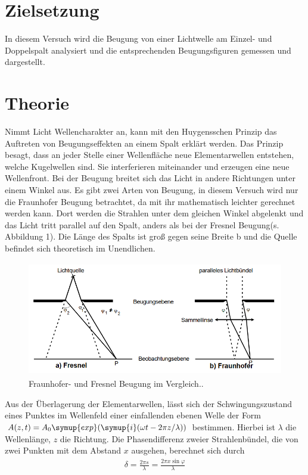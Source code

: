 \section{Zielsetzung}
\label{sec:Zielsetzung}
In diesem Versuch wird die Beugung von einer Lichtwelle am Einzel- und Doppelspalt analysiert und die entsprechenden Beugungsfiguren gemessen und dargestellt.

\section{Theorie}
\label{sec:Theorie}
Nimmt Licht Wellencharakter an, kann mit den Huygensschen Prinzip das Auftreten von Beugungseffekten an einem Spalt erklärt werden.
Das Prinzip besagt, dass an jeder Stelle einer Wellenfläche neue Elementarwellen entstehen, welche Kugelwellen sind. Sie interferieren miteinander und erzeugen eine neue Wellenfront. 
Bei der Beugung breitet sich das Licht in andere Richtungen unter einem Winkel aus. Es gibt zwei Arten von Beugung, in diesem Versuch wird nur die Fraunhofer Beugung betrachtet, da mit ihr mathematisch leichter gerechnet werden kann. 
Dort werden die Strahlen unter dem gleichen Winkel abgelenkt und das Licht tritt parallel auf den Spalt, anders als bei der Fresnel Beugung(s. Abbildung 1).
Die Länge des Spalts ist groß gegen seine Breite b und die Quelle befindet sich theoretisch im Unendlichen.
\begin{figure}[H]
  \centering
  \includegraphics[height=5cm]{naherung.PNG}
  \caption{Fraunhofer- und Fresnel Beugung im Vergleich.\cite{kent}.}
\end{figure}
\noindent Aus der Überlagerung der Elementarwellen, lässt sich der Schwingungszustand eines Punktes im Wellenfeld einer einfallenden ebenen Welle der Form $A(z, t) = A_0 \symup{exp}(\symup{i}(\omega t -2\pi z/\lambda))$ 
bestimmen. Hierbei ist $\lambda$  die Wellenlänge, $z$ die Richtung.
Die Phasendifferenz zweier Strahlenbündel, die von zwei Punkten mit dem Abstand $x$ ausgehen, berechnet sich durch
\begin{align}
  \delta = \frac{2\pi s}{\lambda} = \frac{2\pi x \sin{\varphi}}{\lambda}
\end{align}
